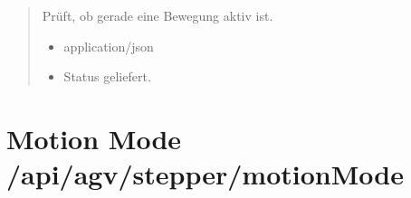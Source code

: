 \documentclass[letterpaper,10pt,english]{sphinxmanual}
\begin{document}
\begin{fulllineitems}
\label{\detokenize{agv_rest_api_stepper:get--api-agv-stepper-isMoving}}
\pysigstartsignatures
\pysigline
{}
\pysigstopsignatures\begin{quote}\begin{description}
\sphinxAtStartPar
Prüft, ob gerade eine Bewegung aktiv ist.

\begin{itemize}
\item {} 
\sphinxAtStartPar
{} \textendash{} application/json

\end{itemize}

\begin{itemize}
\item {} 
\sphinxAtStartPar
{} \textendash{} Status geliefert.

\end{itemize}

\end{description}\end{quote}

\end{fulllineitems}


\sphinxAtStartPar
{}

\begin{sphinxVerbatim}[commandchars=\\\{\}]
\end{sphinxVerbatim}


\section{Motion Mode \textendash{} /api/agv/stepper/motionMode}
\label{\detokenize{agv_rest_api_stepper:motion-mode-api-agv-stepper-motionmode}}\label{\detokenize{agv_rest_api_stepper:get-api-agv-stepper-motionmode}}
\end{document}
